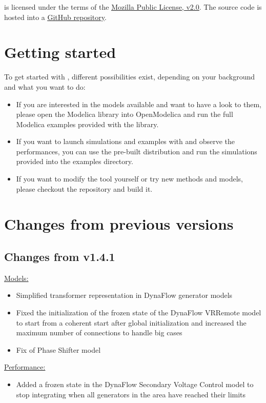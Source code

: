 \documentclass[a4paper, 12pt]{report}
\begin{document}
\Dynawo is licensed under the terms of the \href{http://mozilla.org/MPL/2.0}{\underline{Mozilla Public License, v2.0}}.
The source code is hosted into a \href{https://github.com/dynawo/dynawo} {\underline{GitHub repository}}. \\

\section{Getting started}

To get started with \Dynawo , different possibilities exist, depending on your background and what you want to do:
\begin{itemize}
\item If you are interested in the models available and want to have a look to them, please open the \Dynawo Modelica library into OpenModelica and run the full Modelica examples provided with the library.
\item If you want to launch simulations and examples with \Dynawo and observe the performances, you can use the pre-built distribution and run the simulations provided into the examples directory.
\item If you want to modify the tool yourself or try new methods and models, please checkout the repository and build it.
\end{itemize}

\section{Changes from previous versions}

\subsection{Changes from v1.4.1}
\underline{Models:}

\begin{itemize}
\item Simplified transformer representation in DynaFlow generator models
\item Fixed the initialization of the frozen state of the DynaFlow VRRemote model to start from a coherent start after global initialization and increased the maximum number of connections to handle big cases
\item Fix of Phase Shifter model
\end{itemize}

\underline{Performance:}

\begin{itemize}
\item Added a frozen state in the DynaFlow Secondary Voltage Control model to stop integrating when all generators in the area have reached their limits
\end{itemize}
\end{document}
